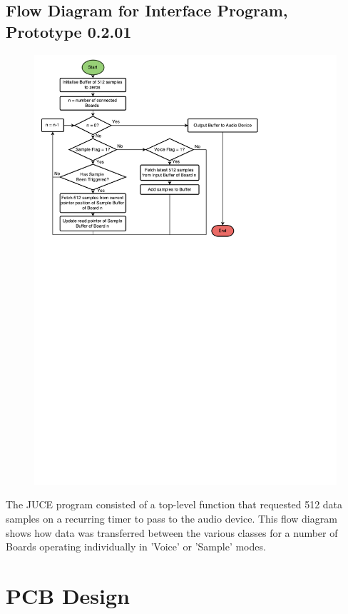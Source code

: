 \subsection{Flow Diagram for Interface Program, Prototype 0.2.01}
\label{juceflow}
\begin{figure}[H]
\centering
\includegraphics[scale=0.7]{Images/JuceFlow}\\
\end{figure}
The JUCE program consisted of a top-level function that requested 512 data samples on a recurring timer to pass to the audio device. This flow diagram shows how data was transferred between the various classes for a number of Boards operating individually in 'Voice' or 'Sample' modes. 


\section{PCB Design}

